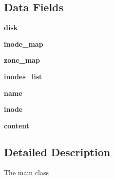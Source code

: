 \subsection*{Data Fields}
\begin{DoxyCompactItemize}
\item 
\hypertarget{classminixfs_1_1minix__file__system_a36c7b5664c44733896398e42189f7c6f}{}{\bfseries disk}\label{classminixfs_1_1minix__file__system_a36c7b5664c44733896398e42189f7c6f}

\item 
\hypertarget{classminixfs_1_1minix__file__system_a1f4f91840a510cd7fc5bcb80c4be2e8d}{}{\bfseries inode\+\_\+map}\label{classminixfs_1_1minix__file__system_a1f4f91840a510cd7fc5bcb80c4be2e8d}

\item 
\hypertarget{classminixfs_1_1minix__file__system_a73bbcc7382e0e5f4e3e39c4d34e823b1}{}{\bfseries zone\+\_\+map}\label{classminixfs_1_1minix__file__system_a73bbcc7382e0e5f4e3e39c4d34e823b1}

\item 
\hypertarget{classminixfs_1_1minix__file__system_ace64866ea69e2b7b947d9ee2b97820a2}{}{\bfseries inodes\+\_\+list}\label{classminixfs_1_1minix__file__system_ace64866ea69e2b7b947d9ee2b97820a2}

\item 
\hypertarget{classminixfs_1_1minix__file__system_ab74e6bf80237ddc4109968cedc58c151}{}{\bfseries name}\label{classminixfs_1_1minix__file__system_ab74e6bf80237ddc4109968cedc58c151}

\item 
\hypertarget{classminixfs_1_1minix__file__system_ac6f54b4e2a370e4eb77474268c5369be}{}{\bfseries inode}\label{classminixfs_1_1minix__file__system_ac6f54b4e2a370e4eb77474268c5369be}

\item 
\hypertarget{classminixfs_1_1minix__file__system_a6858851eee0e05f318897984757b59dc}{}{\bfseries content}\label{classminixfs_1_1minix__file__system_a6858851eee0e05f318897984757b59dc}

\end{DoxyCompactItemize}


\subsection{Detailed Description}
\begin{DoxyVerb}    The main class
\end{DoxyVerb}
 

